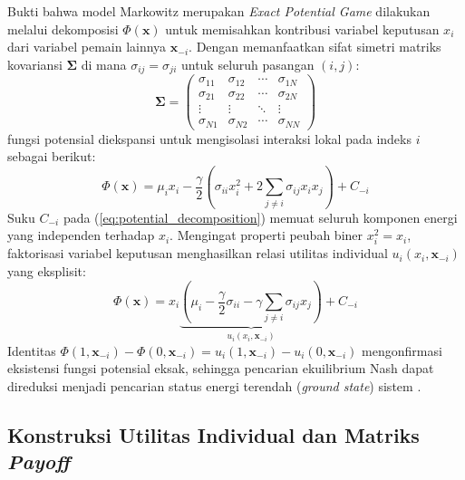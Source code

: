 Bukti bahwa model Markowitz merupakan \textit{Exact Potential Game} dilakukan melalui dekomposisi $\Phi(\mathbf{x})$ untuk memisahkan kontribusi variabel keputusan $x_i$ dari variabel pemain lainnya $\mathbf{x}_{-i}$. Dengan memanfaatkan sifat simetri matriks kovariansi $\mathbf{\Sigma}$ di mana $\sigma_{ij} = \sigma_{ji}$ untuk seluruh pasangan $(i, j)$:
\begin{equation}
\mathbf{\Sigma} = 
\begin{pmatrix}
\sigma_{11} & \sigma_{12} & \cdots & \sigma_{1N} \\
\sigma_{21} & \sigma_{22} & \cdots & \sigma_{2N} \\
\vdots & \vdots & \ddots & \vdots \\
\sigma_{N1} & \sigma_{N2} & \cdots & \sigma_{NN}
\end{pmatrix}
\label{eq:matrix_sigma}
\end{equation}
fungsi potensial diekspansi untuk mengisolasi interaksi lokal pada indeks $i$ sebagai berikut:
\begin{equation}
\Phi(\mathbf{x}) = \mu_i x_i - \frac{\gamma}{2} \left( \sigma_{ii} x_i^2 + 2 \sum_{j \neq i} \sigma_{ij} x_i x_j \right) + C_{-i}
\label{eq:potential_decomposition}
\end{equation}
Suku $C_{-i}$ pada (\ref{eq:potential_decomposition}) memuat seluruh komponen energi yang independen terhadap $x_i$. Mengingat properti peubah biner $x_i^2 = x_i$, faktorisasi variabel keputusan menghasilkan relasi utilitas individual $u_i(x_i, \mathbf{x}_{-i})$ yang eksplisit:
\begin{equation}
\Phi(\mathbf{x}) = x_i \underbrace{\left( \mu_i - \frac{\gamma}{2} \sigma_{ii} - \gamma \sum_{j \neq i} \sigma_{ij} x_j \right)}_{u_i(x_i, \mathbf{x}_{-i})} + C_{-i}
\label{eq:utility_relation}
\end{equation}
Identitas $\Phi(1, \mathbf{x}_{-i}) - \Phi(0, \mathbf{x}_{-i}) = u_i(1, \mathbf{x}_{-i}) - u_i(0, \mathbf{x}_{-i})$ mengonfirmasi eksistensi fungsi potensial eksak, sehingga pencarian ekuilibrium Nash dapat direduksi menjadi pencarian status energi terendah (\textit{ground state}) sistem \cite{monderer_potential_1996}.

\subsection{Konstruksi Utilitas Individual dan Matriks \textit{Payoff}}

